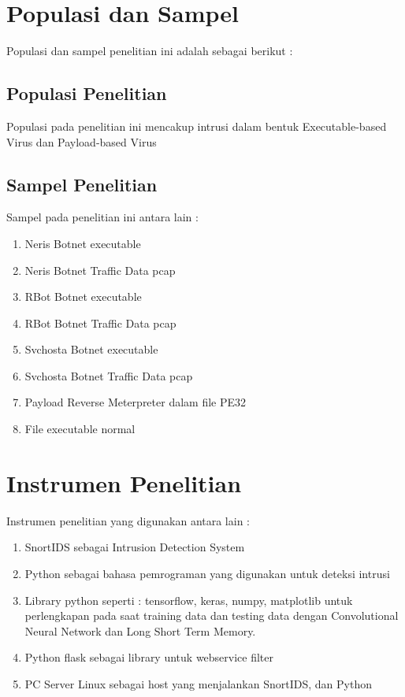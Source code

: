 \documentclass[./skripsi.tex]{subfiles}
\begin{document}
\section{Populasi dan Sampel}
\par Populasi dan sampel penelitian ini adalah sebagai berikut :
\subsection{Populasi Penelitian}
\par Populasi pada penelitian ini mencakup intrusi dalam bentuk Executable-based Virus dan Payload-based Virus
\subsection{Sampel Penelitian}
\par Sampel pada penelitian ini antara lain :
\begin{enumerate}
    \item Neris Botnet executable
    \item Neris Botnet Traffic Data pcap
    \item RBot Botnet executable
    \item RBot Botnet Traffic Data pcap
    \item Svchosta Botnet executable
    \item Svchosta Botnet Traffic Data pcap
    \item Payload Reverse Meterpreter dalam file PE32
    \item File executable normal
\end{enumerate}
\section{Instrumen Penelitian}
Instrumen penelitian yang digunakan antara lain :
\begin{enumerate}
    \item SnortIDS sebagai Intrusion Detection System
    \item Python sebagai bahasa pemrograman yang digunakan untuk deteksi intrusi
    \item Library python seperti : tensorflow, keras, numpy, matplotlib untuk perlengkapan pada saat training data dan testing data dengan Convolutional Neural Network dan Long Short Term Memory.
    \item Python flask sebagai library untuk webservice filter
    \item PC Server Linux sebagai host yang menjalankan SnortIDS, dan Python
\end{enumerate}
\end{document}
